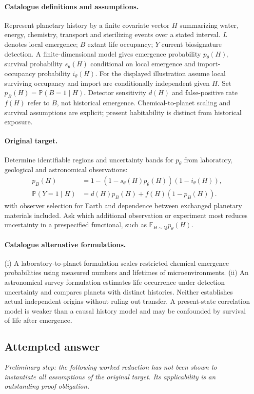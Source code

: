 \documentclass[11pt]{article}
\begin{document}
\paragraph{Catalogue definitions and assumptions.}
Represent planetary history by a finite covariate vector $H$ summarizing water, energy, chemistry, transport and sterilizing events over a stated interval. $L$ denotes local emergence; $B$ extant life occupancy; $Y$ current biosignature detection. A finite-dimensional model gives emergence probability $p_\theta(H)$, survival probability $s_\theta(H)$ conditional on local emergence and import-occupancy probability $i_\theta(H)$. For the displayed illustration assume local surviving occupancy and import are conditionally independent given $H$. Set $p_B(H)=\mathbb{P}(B=1\mid H)$. Detector sensitivity $d(H)$ and false-positive rate $f(H)$ refer to $B$, not historical emergence. Chemical-to-planet scaling and survival assumptions are explicit; present habitability is distinct from historical exposure.
\paragraph{Original target.}
Determine identifiable regions and uncertainty bands for $p_\theta$ from laboratory, geological and astronomical observations:
\[
\begin{aligned}
p_B(H)&=1-(1-s_\theta(H)p_\theta(H))(1-i_\theta(H)),\\
\mathbb{P}(Y=1\mid H)&=d(H)p_B(H)+f(H)(1-p_B(H)).
\end{aligned}
\]
with observer selection for Earth and dependence between exchanged planetary materials included. Ask which additional observation or experiment most reduces uncertainty in a prespecified functional, such as $\mathbb{E}_{H\sim Q}p_\theta(H)$.
\paragraph{Catalogue alternative formulations.}
(i) A laboratory-to-planet formulation scales restricted chemical emergence probabilities using measured numbers and lifetimes of microenvironments. (ii) An astronomical survey formulation estimates life occurrence under detection uncertainty and compares planets with distinct histories. Neither establishes actual independent origins without ruling out transfer. A present-state correlation model is weaker than a causal history model and may be confounded by survival of life after emergence.
\subsection{Attempted answer}
\noindent\emph{Preliminary step: the following worked reduction has not been shown to instantiate all assumptions of the original target. Its applicability is an outstanding proof obligation.}
\end{document}
